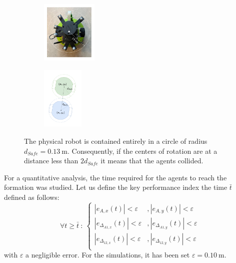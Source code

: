 \documentclass{ifacconf}
\begin{document}
\begin{figure}
    \centering
    \vspace{-0.2cm}
    \hspace{1cm}
   \begin{subfigure}{0.3\columnwidth}
        \includegraphics[height=3cm]{images/robot_dSafe.pdf}
    \end{subfigure}
    \begin{subfigure}{0.3\columnwidth}
        \includegraphics[height=3cm]{images/dSafe.pdf}
    \end{subfigure}
    \caption{The physical robot is contained entirely 
    in a circle of radius $d_{Safe} = \SI{0.13}{\meter}$.
    Consequently, if the centers of rotation are 
    at a distance less than $2d_{Safe}$
    it means that the agents collided.}
    \label{fig:safety_distance}
\end{figure}
For a quantitative analysis, the time required for the agents to reach 
the formation was studied.
Let us define the key performance index the time $\bar{t}$ defined as follows:
\begin{equation}
    \forall t \geq \bar{t}\ : \
    \left\{\begin{aligned}
        \left\lvert {e}_{A,x}(t) \right\rvert < \varepsilon &, \left\lvert {e}_{A,y}(t) \right\rvert < \varepsilon \\
        \left\lvert e_{\Delta_{A1,x}}(t) \right\rvert < \varepsilon &, \left\lvert e_{\Delta_{A1,y}}(t)\right\rvert < \varepsilon \\
        \left\lvert e_{\Delta_{12,x}}(t) \right\rvert < \varepsilon &, \left\lvert e_{\Delta_{12,y}}(t) \right\rvert < \varepsilon \\
    \end{aligned} \right.
\end{equation}
with $\varepsilon$ a negligible error. For the simulations, it has been set 
$\varepsilon = \SI{0.10}{\meter}$.
\end{document}
